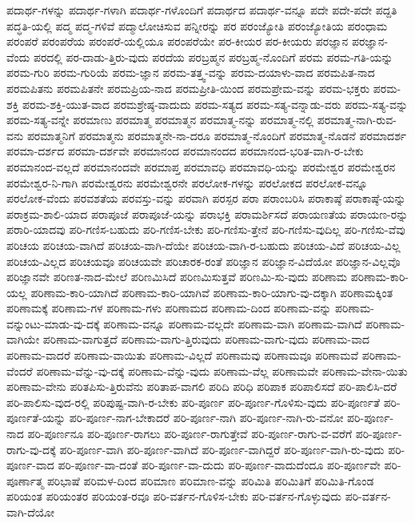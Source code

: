{ಪದಾರ್ಥ-ಗಳನ್ನು
ಪದಾರ್ಥ-ಗಳಾಗಿ
ಪದಾರ್ಥ-ಗಳೊಂದಿಗೆ
ಪದಾರ್ಥದ
ಪದಾರ್ಥ-ವನ್ನೂ
ಪದೇ
ಪದೇ-ಪದೇ
ಪದ್ದತಿ
ಪದ್ಧತಿ-ಯಲ್ಲಿ
ಪದ್ಮ
ಪದ್ಮ-ಗಳಿವೆ
ಪದ್ಮಾಲೋಚಿಸುವ
ಪನ್ನೀರನ್ನು
ಪರ
ಪರಂಜ್ಯೋತಿ
ಪರಂಜ್ಯೋತಿಯ
ಪರಂಧಾಮ
ಪರಂಪರೆ
ಪರಂಪರೆಯ
ಪರಂಪರೆ-ಯಲ್ಲಿಯೂ
ಪರಂಪರೆಯೇ
ಪರ-ಕೀಯರ
ಪರ-ಕೀಯರು
ಪರಜ್ಞಾನ
ಪರಜ್ಞಾನ-ವೆಂದು
ಪರದಲ್ಲಿ
ಪರ-ದಾಡು-ತ್ತಿರು-ವುದು
ಪರದೆಯ
ಪರಬ್ರಹ್ಮನ
ಪರಬ್ರಹ್ಮ-ನೊಂದಿಗೆ
ಪರಮ
ಪರಮ-ಗತಿ-ಯನ್ನು
ಪರಮ-ಗುರಿ
ಪರಮ-ಗುರಿಯೆ
ಪರಮ-ಜ್ಞಾನ
ಪರಮ-ತತ್ತ್ವ-ವನ್ನು
ಪರಮ-ದಯಾಳು-ವಾದ
ಪರಮಪಿತ-ನಾದ
ಪರಮಪಿತನು
ಪರಮಪಿತನೇ
ಪರಮಪ್ರಿಯ-ನಾದ
ಪರಮಪ್ರೀತಿ-ಯಿಂದ
ಪರಮಪ್ರೇಮ-ವನ್ನು
ಪರಮ-ಭಕ್ತರು
ಪರಮ-ಶಕ್ತಿ
ಪರಮ-ಶಕ್ತಿ-ಯುತ-ವಾದ
ಪರಮಶ್ರೇಷ್ಠ-ವಾದುದು
ಪರಮ-ಸತ್ಯದ
ಪರಮ-ಸತ್ಯ-ವನ್ನಾಡು-ವರು
ಪರಮ-ಸತ್ಯ-ವನ್ನು
ಪರಮ-ಸತ್ಯ-ವನ್ನೇ
ಪರಮಾಣು
ಪರಮಾತ್ಮ
ಪರಮಾತ್ಮನ
ಪರಮಾತ್ಮ-ನನ್ನು
ಪರಮಾತ್ಮ-ನಲ್ಲಿ
ಪರಮಾತ್ಮ-ನಾಗಿ-ರುವ-ವನು
ಪರಮಾತ್ಮನಿಗೆ
ಪರಮಾತ್ಮನು
ಪರಮಾತ್ಮನೇ-ನಾ-ದರೂ
ಪರಮಾತ್ಮ-ನೊಂದಿಗೆ
ಪರಮಾತ್ಮ-ನೊಡನೆ
ಪರಮಾದರ್ಶ
ಪರಮಾ-ದರ್ಶದ
ಪರಮಾ-ದರ್ಶವೇ
ಪರಮಾನಂದ
ಪರಮಾನಂದದ
ಪರಮಾನಂದ-ಭರಿತ-ವಾಗಿ-ರ-ಬೇಕು
ಪರಮಾನಂದ-ವಲ್ಲದೆ
ಪರಮಾನಂದವೇ
ಪರಮಾಪ್ತ
ಪರಮಾವಧಿ
ಪರಮಾವಧಿ-ಯನ್ನು
ಪರಮೇಶ್ವರ
ಪರಮೇಶ್ವರನ
ಪರಮೇಶ್ವರ-ನಿ-ಗಾಗಿ
ಪರಮೇಶ್ವರನು
ಪರಮೇಶ್ವರನೇ
ಪರಲೋಕ-ಗಳನ್ನು
ಪರಲೋಕದ
ಪರಲೋಕ-ವನ್ನೂ
ಪರಲೋಕ-ವೆಂದು
ಪರವಶತೆಯ
ಪರವಸ್ತು-ವನ್ನು
ಪರವಾಗಿ
ಪರಸ್ಪರ
ಪರಾ
ಪರಾಂಬರಿಸಿ
ಪರಾಕಾಷ್ಠೆ
ಪರಾಕಾಷ್ಠೆ-ಯನ್ನು
ಪರಾಕ್ರಮ-ಶಾಲಿ-ಯಾದ
ಪರಾಪೂಜೆ
ಪರಾಪೂಜೆ-ಯನ್ನು
ಪರಾಭಕ್ತಿ
ಪರಾಮರ್ಶಿಸದೆ
ಪರಾಯಣತೆಯ
ಪರಾಯಣ-ರನ್ನು
ಪರಾರಿ-ಯಾದವು
ಪರಿ-ಗಣಿಸ-ಬಹುದು
ಪರಿ-ಗಣಿಸ-ಬೇಕು
ಪರಿ-ಗಣಿಸು-ತ್ತೇನೆ
ಪರಿ-ಗಣಿಸು-ವುದಿಲ್ಲ
ಪರಿ-ಗಣಿಸು-ವೆವು
ಪರಿಚಯ
ಪರಿಚಯ-ವಾಗಿದೆ
ಪರಿಚಯ-ವಾಗಿ-ದೆಯೇ
ಪರಿಚಯ-ವಾಗಿ-ರ-ಬಹುದು
ಪರಿಚಯ-ವಿದೆ
ಪರಿಚಯ-ವಿಲ್ಲ
ಪರಿಚಯ-ವಿಲ್ಲದ
ಪರಿಚಯವೂ
ಪರಿಚಯವೇ
ಪರಿಚಾರಕ-ರಂತೆ
ಪರಿಜ್ಞಾನ
ಪರಿಜ್ಞಾನ-ವಿದೆಯೋ
ಪರಿಜ್ಞಾನ-ವಿಲ್ಲವೊ
ಪರಿಜ್ಞಾನವೇ
ಪರಿಣತ-ನಾದ-ಮೇಲೆ
ಪರಿಣಮಿಸಿದೆ
ಪರಿಣಮಿಸುತ್ತವೆ
ಪರಿಣಮಿ-ಸು-ವುದು
ಪರಿಣಾಮ
ಪರಿಣಾಮ-ಕಾರಿ-ಯಲ್ಲ
ಪರಿಣಾಮ-ಕಾರಿ-ಯಾಗಿದೆ
ಪರಿಣಾಮ-ಕಾರಿ-ಯಾಗಿವೆ
ಪರಿಣಾಮ-ಕಾರಿ-ಯಾಗು-ವು-ದಕ್ಕಾಗಿ
ಪರಿಣಾಮಕ್ಕಿಂತ
ಪರಿಣಾಮಕ್ಕೆ
ಪರಿಣಾಮ-ಗಳ
ಪರಿಣಾಮ-ಗಳು
ಪರಿಣಾಮದ
ಪರಿಣಾಮ-ದಿಂದ
ಪರಿಣಾಮ-ವನ್ನು
ಪರಿಣಾಮ-ವನ್ನುಂಟು-ಮಾಡು-ವು-ದಕ್ಕೆ
ಪರಿಣಾಮ-ವನ್ನೂ
ಪರಿಣಾಮ-ವಲ್ಲದೇ
ಪರಿಣಾಮ-ವಾಗಿ
ಪರಿಣಾಮ-ವಾಗಿದೆ
ಪರಿಣಾಮ-ವಾಗಿಯೇ
ಪರಿಣಾಮ-ವಾಗುತ್ತದೆ
ಪರಿಣಾಮ-ವಾಗು-ತ್ತಿರುವುದು
ಪರಿಣಾಮ-ವಾಗು-ವುದು
ಪರಿಣಾಮ-ವಾದ
ಪರಿಣಾಮ-ವಾದರೆ
ಪರಿಣಾಮ-ವಾಯಿತು
ಪರಿಣಾಮ-ವಿಲ್ಲದೆ
ಪರಿಣಾಮವು
ಪರಿಣಾಮವೂ
ಪರಿಣಾಮವೆ
ಪರಿಣಾಮ-ವೆಂದರೆ
ಪರಿಣಾಮ-ವೆನ್ನು-ವು-ದಕ್ಕೆ
ಪರಿಣಾಮ-ವೆನ್ನು-ವುದು
ಪರಿಣಾಮ-ವೆಲ್ಲ
ಪರಿಣಾಮವೇ
ಪರಿಣಾಮ-ವೇನಾ-ಯಿತು
ಪರಿಣಾಮ-ವೇನು
ಪರಿತಪಿಸು-ತ್ತಿರುವೆನು
ಪರಿತಾಪ-ವಾಗಲಿ
ಪರಿದಿ
ಪರಿಧಿ
ಪರಿಪಾಕ
ಪರಿಪಾಲಿಸದೆ
ಪರಿ-ಪಾಲಿಸಿ-ದರೆ
ಪರಿ-ಪಾಲಿಸು-ವುದ-ರಲ್ಲಿ
ಪರಿಪುಷ್ಟ-ವಾಗಿ-ರ-ಬೇಕು
ಪರಿ-ಪೂರ್ಣ
ಪರಿ-ಪೂರ್ಣ-ಗೊಳಿಸು-ವುದು
ಪರಿ-ಪೂರ್ಣತೆ
ಪರಿ-ಪೂರ್ಣತೆ-ಯನ್ನು
ಪರಿ-ಪೂರ್ಣ-ನಾಗ-ಬೇಕಾದರೆ
ಪರಿ-ಪೂರ್ಣ-ನಾಗಿ
ಪರಿ-ಪೂರ್ಣ-ನಾಗಿ-ರು-ವನೋ
ಪರಿ-ಪೂರ್ಣ-ನಾದ
ಪರಿ-ಪೂರ್ಣನೂ
ಪರಿ-ಪೂರ್ಣ-ರಾಗಲು
ಪರಿ-ಪೂರ್ಣ-ರಾಗುತ್ತೇವೆ
ಪರಿ-ಪೂರ್ಣ-ರಾಗು-ವ-ವರೆಗೆ
ಪರಿ-ಪೂರ್ಣ-ರಾಗು-ವು-ದಕ್ಕೆ
ಪರಿ-ಪೂರ್ಣ-ವಾಗಿ
ಪರಿ-ಪೂರ್ಣ-ವಾಗಿದೆ
ಪರಿ-ಪೂರ್ಣ-ವಾಗಿದ್ದರೆ
ಪರಿ-ಪೂರ್ಣ-ವಾಗಿ-ರು-ವುದು
ಪರಿ-ಪೂರ್ಣ-ವಾದ
ಪರಿ-ಪೂರ್ಣ-ವಾ-ದಂತೆ
ಪರಿ-ಪೂರ್ಣ-ವಾ-ದುದು
ಪರಿ-ಪೂರ್ಣ-ವಾದುದೆಂದೂ
ಪರಿ-ಪೂರ್ಣವೇ
ಪರಿ-ಪೂರ್ಣಾತ್ಮ
ಪರಿಭಾಷೆ
ಪರಿಮಳ-ದಿಂದ
ಪರಿಮಾಣ
ಪರಿಮಾಣ-ವನ್ನು
ಪರಿಮಿತಿ
ಪರಿಮಿತಿಗೆ
ಪರಿಮಿತಿ-ಗೊಂಡ
ಪರಿಯಂತ
ಪರಿಯಂತರ
ಪರಿಯಂತ-ರವೂ
ಪರಿ-ವರ್ತನ-ಗೊಳಿಸ-ಬೇಕು
ಪರಿ-ವರ್ತನ-ಗೊಳ್ಳುವುದು
ಪರಿ-ವರ್ತನ-ವಾಗಿ-ದೆಯೋ
}
